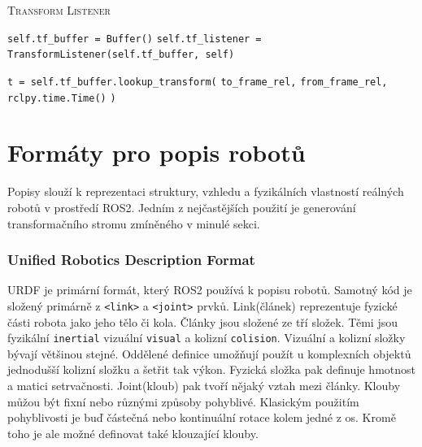 \begin{algorithm}[h!]
	\label{}
	\caption{\textsc{Transform Listener}}
	
	\DontPrintSemicolon
	\SetAlgoNoLine
	\SetNlSty{}{}{:}
	\SetNlSkip{-1.1em}
	
	\BlankLine \Indp\Indpp
	
	\texttt{self.tf\_buffer = Buffer()}\;
	\texttt{self.tf\_listener = TransformListener(self.tf\_buffer, self)}\;

	\BlankLine
	\texttt{t = self.tf\_buffer.lookup\_transform(}\;
	\Indp\Indp
	\texttt{to\_frame\_rel,}\;
	\texttt{from\_frame\_rel,}\;
	\texttt{rclpy.time.Time()}\;
	\Indm\Indm
	\texttt{)}\;
	
\end{algorithm}

\section{Formáty pro popis robotů}
Popisy slouží k reprezentaci struktury, vzhledu a fyzikálních vlastností reálných robotů v prostředí ROS2. Jedním z nejčastějších použití je generování transformačního stromu zmíněného v minulé sekci.

\subsubsection*{Unified Robotics Description Format}
URDF je primární formát, který ROS2 používá k popisu robotů. Samotný kód je složený primárně z \verb|<link>| a \verb|<joint>| prvků. Link(článek) reprezentuje fyzické části robota jako jeho tělo či kola. Články jsou složené ze tří složek. Těmi jsou fyzikální \verb|inertial| vizuální \verb|visual| a kolizní \verb|colision|. Vizuální a kolizní složky bývají většinou stejné. Oddělené definice umožňují použít u komplexních objektů jednodušší kolizní složku a šetřit tak výkon. Fyzická složka pak definuje hmotnost a matici setrvačnosti. Joint(kloub) pak tvoří nějaký vztah mezi články. Klouby můžou být fixní nebo různými způsoby pohyblivé. Klasickým použitím pohyblivosti je buď částečná nebo kontinuální rotace kolem jedné z os. Kromě toho je ale možné definovat také klouzající klouby. \cite{ros2_documentation} 

